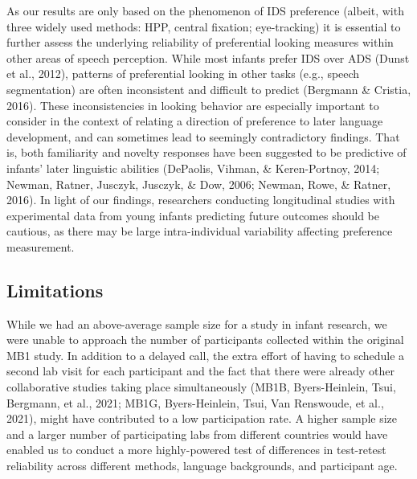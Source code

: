 \documentclass[
  man,floatsintext]{apa6}
\begin{document}
As our results are only based on the phenomenon of IDS preference (albeit, with three widely used methods: HPP, central fixation; eye-tracking) it is essential to further assess the underlying reliability of preferential looking measures within other areas of speech perception.
While most infants prefer IDS over ADS (Dunst et al., 2012), patterns of preferential looking in other tasks (e.g., speech segmentation) are often inconsistent and difficult to predict (Bergmann \& Cristia, 2016).
These inconsistencies in looking behavior are especially important to consider in the context of relating a direction of preference to later language development, and can sometimes lead to seemingly contradictory findings.
That is, both familiarity and novelty responses have been suggested to be predictive of infants' later linguistic abilities (DePaolis, Vihman, \& Keren-Portnoy, 2014; Newman, Ratner, Jusczyk, Jusczyk, \& Dow, 2006; Newman, Rowe, \& Ratner, 2016).
In light of our findings, researchers conducting longitudinal studies with experimental data from young infants predicting future outcomes should be cautious, as there may be large intra-individual variability affecting preference measurement.

\hypertarget{limitations}{%
\subsection{Limitations}\label{limitations}}

While we had an above-average sample size for a study in infant research, we were unable to approach the number of participants collected within the original MB1 study.
In addition to a delayed call, the extra effort of having to schedule a second lab visit for each participant and the fact that there were already other collaborative studies taking place simultaneously (MB1B, Byers-Heinlein, Tsui, Bergmann, et al., 2021; MB1G, Byers-Heinlein, Tsui, Van Renswoude, et al., 2021), might have contributed to a low participation rate.
A higher sample size and a larger number of participating labs from different countries would have enabled us to conduct a more highly-powered test of differences in test-retest reliability across different methods, language backgrounds, and participant age.
\end{document}

